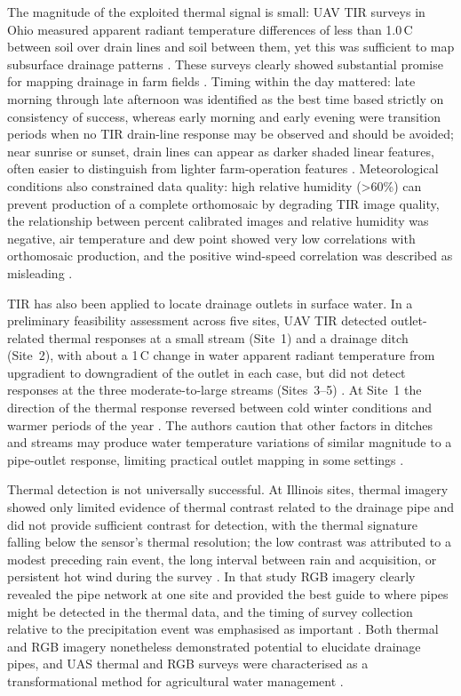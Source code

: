 \documentclass[11pt]{article}
\begin{document}
The magnitude of the exploited thermal signal is small: UAV TIR surveys in Ohio measured apparent radiant temperature differences of less than 1.0\,\textdegree C between soil over drain lines and soil between them, yet this was sufficient to map subsurface drainage patterns \parencite{Allred2021}. These surveys clearly showed substantial promise for mapping drainage in farm fields \parencite{Allred2021}. Timing within the day mattered: late morning through late afternoon was identified as the best time based strictly on consistency of success, whereas early morning and early evening were transition periods when no TIR drain-line response may be observed and should be avoided; near sunrise or sunset, drain lines can appear as darker shaded linear features, often easier to distinguish from lighter farm-operation features \parencite{Allred2021}. Meteorological conditions also constrained data quality: high relative humidity (>60\%) can prevent production of a complete orthomosaic by degrading TIR image quality, the relationship between percent calibrated images and relative humidity was negative, air temperature and dew point showed very low correlations with orthomosaic production, and the positive wind-speed correlation was described as misleading \parencite{Allred2021}.

TIR has also been applied to locate drainage outlets in surface water. In a preliminary feasibility assessment across five sites, UAV TIR detected outlet-related thermal responses at a small stream (Site~1) and a drainage ditch (Site~2), with about a 1\,\textdegree C change in water apparent radiant temperature from upgradient to downgradient of the outlet in each case, but did not detect responses at the three moderate-to-large streams (Sites~3--5) \parencite{Allred2022}. At Site~1 the direction of the thermal response reversed between cold winter conditions and warmer periods of the year \parencite{Allred2022}. The authors caution that other factors in ditches and streams may produce water temperature variations of similar magnitude to a pipe-outlet response, limiting practical outlet mapping in some settings \parencite{Allred2022}.

Thermal detection is not universally successful. At Illinois sites, thermal imagery showed only limited evidence of thermal contrast related to the drainage pipe and did not provide sufficient contrast for detection, with the thermal signature falling below the sensor's thermal resolution; the low contrast was attributed to a modest preceding rain event, the long interval between rain and acquisition, or persistent hot wind during the survey \parencite{Kratt2020}. In that study RGB imagery clearly revealed the pipe network at one site and provided the best guide to where pipes might be detected in the thermal data, and the timing of survey collection relative to the precipitation event was emphasised as important \parencite{Kratt2020}. Both thermal and RGB imagery nonetheless demonstrated potential to elucidate drainage pipes, and UAS thermal and RGB surveys were characterised as a transformational method for agricultural water management \parencite{Kratt2020}.
\end{document}
